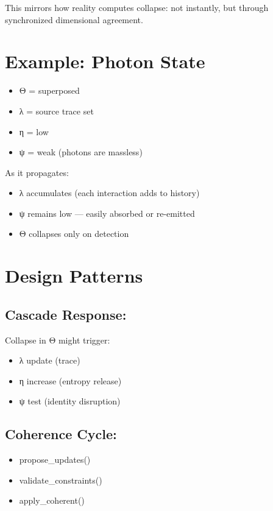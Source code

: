 This mirrors how reality computes collapse: not instantly, but through synchronized dimensional agreement.

\section{Example: Photon State}

\begin{itemize}
\item Θ = superposed
\item λ = source trace set
\item η = low
\item ψ = weak (photons are massless)
\end{itemize}

As it propagates:
\begin{itemize}
\item λ accumulates (each interaction adds to history)
\item ψ remains low — easily absorbed or re-emitted
\item Θ collapses only on detection
\end{itemize}

\section{Design Patterns}

\subsection*{Cascade Response:}

Collapse in Θ might trigger:
\begin{itemize}
\item λ update (trace)
\item η increase (entropy release)
\item ψ test (identity disruption)
\end{itemize}

\subsection*{Coherence Cycle:}

\begin{itemize}
\item propose\_updates()
\item validate\_constraints()
\item apply\_coherent()
\end{itemize}

